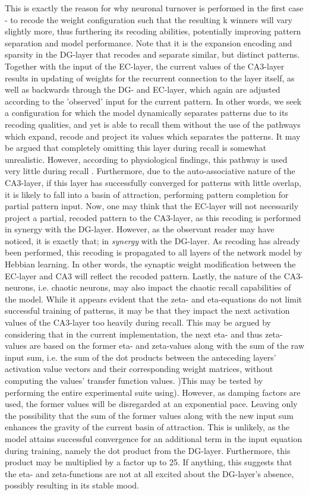 This is exactly the reason for why neuronal turnover is performed in the first case - to recode the weight configuration such that the resulting k winners will vary slightly more, thus furthering its recoding abilities, potentially improving pattern separation and model performance. Note that it is the expansion encoding and sparsity in the DG-layer that recodes and separate similar, but distinct patterns. Together with the input of the EC-layer, the current values of the CA3-layer results in updating of weights for the recurrent connection to the layer itself, as well as backwards through the DG- and EC-layer, which again are adjusted according to the 'observed' input for the current pattern. In other words, we seek a configuration for which the model dynamically separates patterns due to its recoding qualities, and yet is able to recall them without the use of the pathways which expand, recode and project its values which separates the patterns. It may be argued that completely omitting this layer during recall is somewhat unrealistic. 
However, according to physiological findings, this pathway is used very little during recall \citep{Wakagi2008}. 
Furthermore, due to the auto-associative nature of the CA3-layer, if this layer has successfully converged for patterns with little overlap, it is likely to fall into a basin of attraction, performing pattern completion for partial pattern input. Now, one may think that the EC-layer will not necessarily project a partial, recoded pattern to the CA3-layer, as this recoding is performed in synergy with the DG-layer. However, as the observant reader may have noticed, it is exactly that; in \textit{synergy} with the DG-layer. As recoding has already been performed, this recoding is propagated to all layers of the network model by Hebbian learning. In other words, the synaptic weight modification between the EC-layer and CA3 will reflect the recoded pattern.
Lastly, the nature of the CA3-neurons, i.e. chaotic neurons, may also impact the chaotic recall capabilities of the model. While it appears evident that the zeta- and eta-equations do not limit successful training of patterns, it may be that they impact the next activation values of the CA3-layer too heavily during recall. This may be argued by considering that in the current implementation, the next eta- and thus zeta-values are based on the former eta- and zeta-values along with the sum of the raw input sum, i.e. the sum of the dot products between the anteceding layers' activation value vectors and their corresponding weight matrices, without computing the values' transfer function values. )This may be tested by performing the entire experimental suite using). However, as damping factors are used, the former values will be disregarded at an exponential pace. Leaving only the possibility that the sum of the former values along with the new input sum enhances the gravity of the current basin of attraction. This is unlikely, as the model attains successful convergence for an additional term in the input equation during training, namely the dot product from the DG-layer. Furthermore, this product may be multiplied by a factor up to 25. If anything, this suggests that the eta- and zeta-functions are not at all excited about the DG-layer's absence, possibly resulting in its stable mood.


